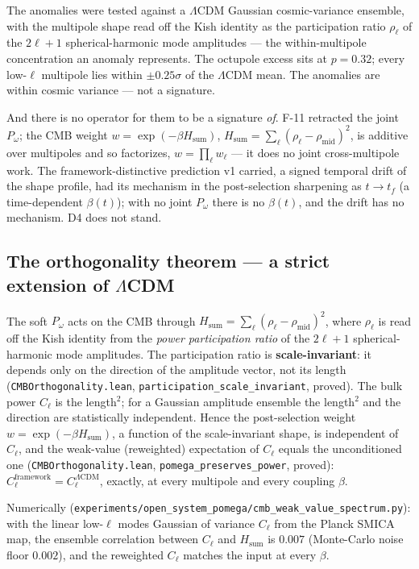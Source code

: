 \documentclass[11pt,a4paper]{article}
\newcommand{\Pomega}{P_{\omega}}
\begin{document}
The anomalies were tested against a $\Lambda$CDM Gaussian cosmic-variance ensemble, with the multipole shape read off the Kish identity as the participation ratio $\rho_\ell$ of the $2\ell+1$ spherical-harmonic mode amplitudes --- the within-multipole concentration an anomaly represents. The octupole excess sits at $p = 0.32$; every low-$\ell$ multipole lies within $\pm 0.25\sigma$ of the $\Lambda$CDM mean. The anomalies are within cosmic variance --- not a signature.

And there is no operator for them to be a signature \emph{of}. F-11 retracted the joint $\Pomega$; the CMB weight $w = \exp(-\beta H_{\text{sum}})$, $H_{\text{sum}} = \sum_\ell (\rho_\ell - \rho_{\text{mid}})^2$, is additive over multipoles and so factorizes, $w = \prod_\ell w_\ell$ --- it does no joint cross-multipole work. The framework-distinctive prediction v1 carried, a signed temporal drift of the shape profile, had its mechanism in the post-selection sharpening as $t \to t_f$ (a time-dependent $\beta(t)$); with no joint $\Pomega$ there is no $\beta(t)$, and the drift has no mechanism. D4 does not stand.

\subsection*{The orthogonality theorem --- a strict extension of $\Lambda$CDM}

The soft $\Pomega$ acts on the CMB through $H_{\text{sum}} = \sum_\ell (\rho_\ell - \rho_{\text{mid}})^2$, where $\rho_\ell$ is read off the Kish identity from the \emph{power participation ratio} of the $2\ell+1$ spherical-harmonic mode amplitudes. The participation ratio is \textbf{scale-invariant}: it depends only on the direction of the amplitude vector, not its length (\texttt{CMBOrthogonality.lean}, \texttt{participation\_scale\_invariant}, proved). The bulk power $C_\ell$ is the length$^2$; for a Gaussian amplitude ensemble the length$^2$ and the direction are statistically independent. Hence the post-selection weight $w = \exp(-\beta H_{\text{sum}})$, a function of the scale-invariant shape, is independent of $C_\ell$, and the weak-value (reweighted) expectation of $C_\ell$ equals the unconditioned one (\texttt{CMBOrthogonality.lean}, \texttt{pomega\_preserves\_power}, proved): $C_\ell^{\text{framework}} = C_\ell^{\Lambda\text{CDM}}$, exactly, at every multipole and every coupling $\beta$.

Numerically (\texttt{experiments/open\_system\_pomega/cmb\_weak\_value\_spectrum.py}): with the linear low-$\ell$ modes Gaussian of variance $C_\ell$ from the Planck SMICA map, the ensemble correlation between $C_\ell$ and $H_{\text{sum}}$ is $0.007$ (Monte-Carlo noise floor $0.002$), and the reweighted $C_\ell$ matches the input at every $\beta$.
\end{document}

